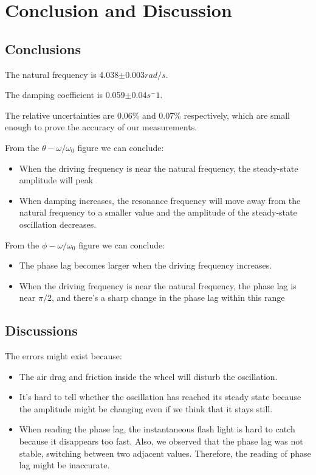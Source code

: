 \documentclass[12pt,a4paper]{article}
\begin{document}
\section{Conclusion and Discussion}
\subsection{Conclusions}
The natural frequency is 4.038$\pm$0.003$rad/s$. \par 
The damping coefficient is 0.059$\pm$0.04$s^-1$. \par
The relative uncertainties are 0.06\% and 0.07\% respectively, which are small enough to prove the accuracy of our measurements.\par 
From the $\theta-\omega/\omega_0$  figure we can conclude:
\begin{itemize}
    \item When the driving frequency is near the natural frequency, the steady-state amplitude will peak
    \item When damping increases, the resonance frequency will move away from the natural frequency to a smaller value and the amplitude of the steady-state oscillation decreases.
\end{itemize}
From the $\phi-\omega/\omega_0$ figure we can conclude:
\begin{itemize}
    \item The phase lag becomes larger when the driving frequency increases.
    \item When the driving frequency is near the natural frequency, the phase lag is near $\pi/2$, and there’s a sharp change in the phase lag within this range
\end{itemize}

\subsection{Discussions}
The errors might exist because:
\begin{itemize}
    \item The air drag and friction inside the wheel will disturb the oscillation.
    \item It’s hard to tell whether the oscillation has reached its steady state because the amplitude might be changing even if we think that it stays still.
    \item	When reading the phase lag, the instantaneous flash light is hard to catch because it disappears too fast. Also, we observed that the phase lag was not stable, switching between two adjacent values. Therefore, the reading of phase lag might be inaccurate.
\end{itemize}
\end{document}
